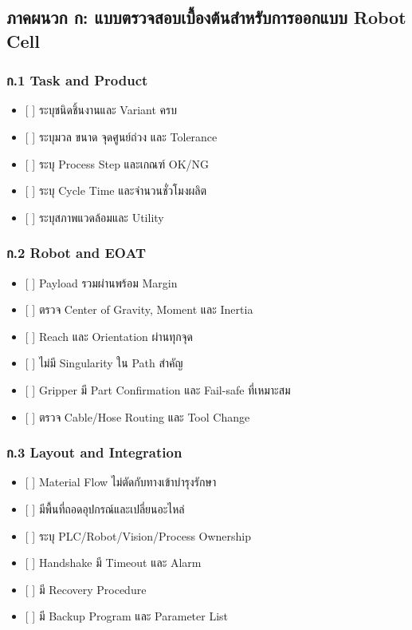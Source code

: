 \subsection{ภาคผนวก ก: แบบตรวจสอบเบื้องต้นสำหรับการออกแบบ Robot Cell}

\subsubsection{ก.1 Task and Product}

\begin{itemize}
    \item {[ ]} ระบุชนิดชิ้นงานและ Variant ครบ
    \item {[ ]} ระบุมวล ขนาด จุดศูนย์ถ่วง และ Tolerance
    \item {[ ]} ระบุ Process Step และเกณฑ์ OK/NG
    \item {[ ]} ระบุ Cycle Time และจำนวนชั่วโมงผลิต
    \item {[ ]} ระบุสภาพแวดล้อมและ Utility
\end{itemize}

\subsubsection{ก.2 Robot and EOAT}

\begin{itemize}
    \item {[ ]} Payload รวมผ่านพร้อม Margin
    \item {[ ]} ตรวจ Center of Gravity, Moment และ Inertia
    \item {[ ]} Reach และ Orientation ผ่านทุกจุด
    \item {[ ]} ไม่มี Singularity ใน Path สำคัญ
    \item {[ ]} Gripper มี Part Confirmation และ Fail-safe ที่เหมาะสม
    \item {[ ]} ตรวจ Cable/Hose Routing และ Tool Change
\end{itemize}

\subsubsection{ก.3 Layout and Integration}

\begin{itemize}
    \item {[ ]} Material Flow ไม่ตัดกับทางเข้าบำรุงรักษา
    \item {[ ]} มีพื้นที่ถอดอุปกรณ์และเปลี่ยนอะไหล่
    \item {[ ]} ระบุ PLC/Robot/Vision/Process Ownership
    \item {[ ]} Handshake มี Timeout และ Alarm
    \item {[ ]} มี Recovery Procedure
    \item {[ ]} มี Backup Program และ Parameter List
\end{itemize}

